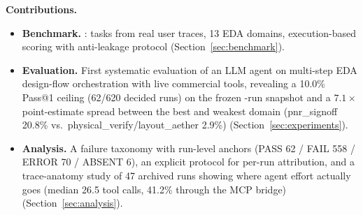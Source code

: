 \noindent\textbf{Contributions.}
\begin{itemize}
    \item \textbf{Benchmark.} \bench: \Ntasks{} tasks from real user traces, 13 EDA domains, execution-based scoring with anti-leakage protocol (Section~\ref{sec:benchmark}).
    \item \textbf{Evaluation.} First systematic evaluation of an LLM agent on multi-step EDA design-flow orchestration with live commercial tools, revealing a 10.0\% Pass@1 ceiling (62/620 decided runs) on the frozen \Neval{}-run snapshot and a $7.1\times$ point-estimate spread between the best and weakest domain (pnr\_signoff 20.8\% vs.\ physical\_verify/layout\_aether 2.9\%) (Section~\ref{sec:experiments}).
    \item \textbf{Analysis.} A failure taxonomy with run-level anchors (PASS 62 / FAIL 558 / ERROR 70 / ABSENT 6), an explicit protocol for per-run attribution, and a trace-anatomy study of 47 archived runs showing where agent effort actually goes (median 26.5 tool calls, 41.2\% through the MCP bridge) (Section~\ref{sec:analysis}).
\end{itemize}
